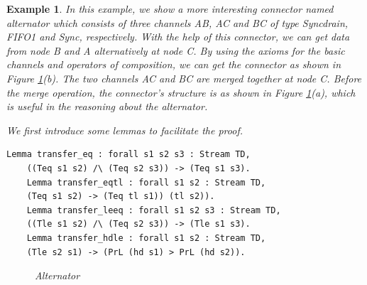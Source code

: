 \documentclass[3p,times]{elsarticle}
\newtheorem{example}{Example}[section]
\begin{document}
\begin{example}\label{ex:alternator}
In this example, we show a more interesting connector named \emph{alternator} which consists of three channels \emph{AB}, \emph{AC} and \emph{BC} of type Syncdrain, FIFO1 and Sync, respectively. With the help of this connector, we can get data from node \emph{B} and \emph{A} alternatively at node \emph{C}.
By using the axioms for the basic channels and operators of composition, we can get the connector as shown in Figure \ref{fig:alternator}(b). The two
channels \emph{AC} and \emph{BC} are merged together at node \emph{C}. Before the merge operation, the connector's structure is as shown in
Figure \ref{fig:alternator}(a), which is useful in the reasoning about the alternator.


We first introduce some lemmas to facilitate the proof.
\begin{lstlisting}[language=coq]
    Lemma transfer_eq : forall s1 s2 s3 : Stream TD,
    ((Teq s1 s2) /\ (Teq s2 s3)) -> (Teq s1 s3).
    Lemma transfer_eqtl : forall s1 s2 : Stream TD,
    (Teq s1 s2) -> (Teq tl s1)) (tl s2)).
    Lemma transfer_leeq : forall s1 s2 s3 : Stream TD,
    ((Tle s1 s2) /\ (Teq s2 s3)) -> (Tle s1 s3).
    Lemma transfer_hdle : forall s1 s2 : Stream TD,
    (Tle s2 s1) -> (PrL (hd s1) > PrL (hd s2)).
\end{lstlisting}

\begin{figure}
\vspace{0cm}
\centering
{}
\caption{Alternator}
\label{fig:alternator}
\end{figure}


\end{example}
\end{document}
